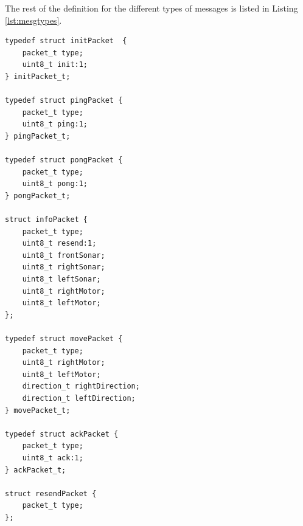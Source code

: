 The rest of the definition for the different types of messages is listed in
Listing \ref{lst:mesgtypes}.
\begin{lstlisting}[label=lst:mesgtypes,float,
                   caption={Message Types Definitions}]
typedef struct initPacket  {
    packet_t type;
    uint8_t init:1;
} initPacket_t;

typedef struct pingPacket {
    packet_t type;
    uint8_t ping:1;
} pingPacket_t;

typedef struct pongPacket {
    packet_t type;
    uint8_t pong:1;
} pongPacket_t;

struct infoPacket {
    packet_t type;
    uint8_t resend:1;
    uint8_t frontSonar;
    uint8_t rightSonar;
    uint8_t leftSonar;
    uint8_t rightMotor;
    uint8_t leftMotor;
};

typedef struct movePacket {
    packet_t type;
    uint8_t rightMotor;
    uint8_t leftMotor;
    direction_t rightDirection;
    direction_t leftDirection;
} movePacket_t;

typedef struct ackPacket {
    packet_t type;
    uint8_t ack:1;
} ackPacket_t;

struct resendPacket {
    packet_t type;
};
\end{lstlisting}

